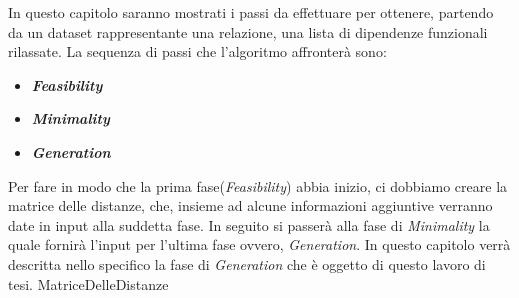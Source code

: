 In questo capitolo saranno mostrati i passi da effettuare per ottenere, partendo da un dataset rappresentante una relazione, una lista di dipendenze funzionali rilassate.
La sequenza di passi che l'algoritmo affronterà sono:
\begin{itemize}
	\item \textbf{\emph{Feasibility}}
	\item \textbf{\emph{Minimality}}
	\item \textbf{\emph{Generation}}
\end{itemize}
Per fare in modo che la prima fase(\emph{Feasibility}) abbia inizio, ci dobbiamo creare la matrice delle distanze, che, insieme ad alcune informazioni aggiuntive verranno date in input alla suddetta fase.
In seguito si passerà alla fase di \textit{Minimality} la quale fornirà l'input per l'ultima fase ovvero, \textit{Generation}. In questo capitolo verrà descritta nello specifico la fase di \textit{Generation} che è oggetto di questo lavoro di tesi.
{MatriceDelleDistanze}

